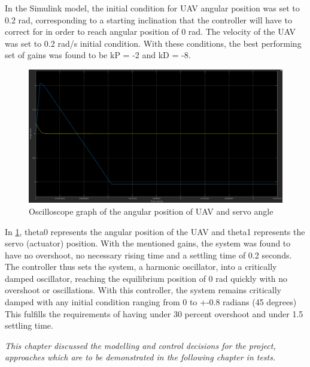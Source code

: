 In the Simulink model, the initial condition for UAV angular position was set to 0.2 rad, corresponding to a starting inclination that the controller will have to correct for in order to reach angular position of 0 rad. The velocity of the UAV was set to 0.2 rad/s initial condition. With these conditions, the best performing set of gains was found to be kP = -2 and kD = -8.  

\begin{figure}[H]
    \centering
    \includegraphics[scale=0.3]{graphics/Control/TSP2D6.png}
    \caption{Oscilloscope graph of the angular position of UAV and servo angle}
     \label{fig:Oscilloscope graph of the angular position of UAV and servo angle}
\end{figure} 

In \ref{fig:Oscilloscope graph of the angular position of UAV and servo angle}, theta0 represents the angular position of the UAV and theta1 represents the servo (actuator) position. With the mentioned gains, the system was found to have no overshoot, no necessary rising time and a settling time of 0.2 seconds. The controller thus sets the system, a harmonic oscillator, into a critically damped oscillator, reaching the equilibrium position of 0 rad quickly with no overshoot or oscillations. With this controller, the system remains critically damped with any initial condition ranging from 0 to +-0.8 radians (45 degrees)
This fulfills the requirements of having under 30 percent overshoot and under 1.5 settling time. 



\textit{This chapter discussed the modelling and control decisions for the project, approaches which are to be demonstrated in the following chapter in tests. }


